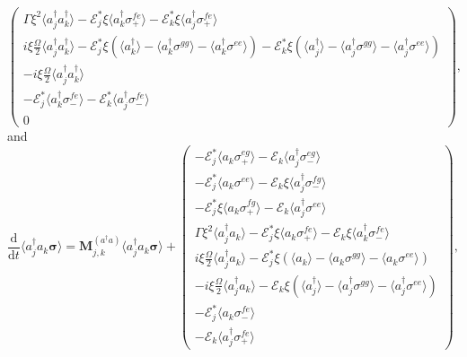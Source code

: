 \documentclass{article}
\newcommand{\ddt}{\frac{\mathrm{d}}{\mathrm{d}t}}
\begin{document}
\begin{subequations}
\begin{equation}
\begin{pmatrix}
		\Gamma \xi^{2} \langle a_{j}^{\dagger} a^{\dagger}_{k} \rangle - \mathcal{E}_{j}^{*} \xi \langle a^{\dagger}_{k} \sigma^{fe}_{+} \rangle - \mathcal{E}_{k}^{*} \xi \langle a^{\dagger}_{j} \sigma^{fe}_{+} \rangle \\
		i \xi \frac{\Omega}{2} \langle a_{j}^{\dagger} a^{\dagger}_{k} \rangle - \mathcal{E}_{j}^{*} \xi \left( \langle a^{\dagger}_{k} \rangle - \langle a^{\dagger}_{k} \sigma^{gg} \rangle - \langle a^{\dagger}_{k} \sigma^{ee} \rangle \right) - \mathcal{E}_{k}^{*} \xi \left( \langle a^{\dagger}_{j} \rangle - \langle a^{\dagger}_{j} \sigma^{gg} \rangle - \langle a^{\dagger}_{j} \sigma^{ee} \rangle \right) \\
		-i \xi \frac{\Omega}{2} \langle a_{j}^{\dagger} a^{\dagger}_{k} \rangle \\
		-\mathcal{E}_{j}^{*} \langle a^{\dagger}_{k} \sigma^{fe}_{-} \rangle - \mathcal{E}_{k}^{*} \langle a^{\dagger}_{j} \sigma^{fe}_{-} \rangle \\
		0
	\end{pmatrix},
\end{equation}
\end{subequations}
and
\begin{equation}
	\ddt \langle a^{\dagger}_{j} a_{k} \bm{\sigma} \rangle = \bm{M}_{j, k}^{(a^{\dagger} a)} \langle a^{\dagger}_{j} a_{k} \bm{\sigma} \rangle +
	\begin{pmatrix}
		-\mathcal{E}_{j}^{*} \langle a_{k} \sigma^{eg}_{+} \rangle - \mathcal{E}_{k} \langle a^{\dagger}_{j} \sigma^{eg}_{-} \rangle \\
		-\mathcal{E}_{j}^{*} \langle a_{k} \sigma^{ee} \rangle - \mathcal{E}_{k} \xi \langle a^{\dagger}_{j} \sigma^{fg}_{-} \rangle \\
		-\mathcal{E}_{j}^{*} \xi \langle a_{k} \sigma^{fg}_{+} \rangle - \mathcal{E}_{k} \langle a^{\dagger}_{j} \sigma^{ee} \rangle \\
		\Gamma \xi^{2} \langle a^{\dagger}_{j} a_{k} \rangle - \mathcal{E}_{j}^{*} \xi \langle a_{k} \sigma^{fe}_{+} \rangle - \mathcal{E}_{k} \xi \langle a^{\dagger}_{k} \sigma^{fe}_{-} \rangle \\
		i \xi \frac{\Omega}{2} \langle a^{\dagger}_{j} a_{k} \rangle - \mathcal{E}_{j}^{*} \xi \left( \langle a_{k} \rangle - \langle a_{k} \sigma^{gg} \rangle - \langle a_{k} \sigma^{ee} \rangle \right) \\
		-i \xi \frac{\Omega}{2} \langle a^{\dagger}_{j} a_{k} \rangle - \mathcal{E}_{k} \xi \left( \langle a^{\dagger}_{j} \rangle - \langle a^{\dagger}_{j} \sigma^{gg} \rangle - \langle a^{\dagger}_{j} \sigma^{ee} \rangle \right) \\
		-\mathcal{E}_{j}^{*} \langle a_{k} \sigma^{fe}_{-} \rangle \\
		-\mathcal{E}_{k} \langle a^{\dagger}_{j} \sigma^{fe}_{+} \rangle
	\end{pmatrix},
\end{equation}
\end{document}
